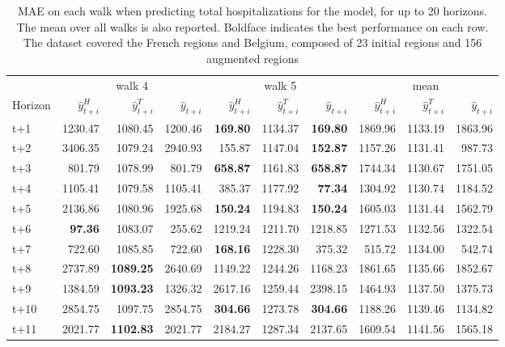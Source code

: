 \begin{table}[H]
\centering
\caption{MAE on each walk when predicting total hospitalizations for the model, for up to 20 horizons. The mean over all walks is also reported. Boldface indicates the best performance on each row. The dataset covered the French regions and Belgium, composed of 23 initial regions and 156 augmented regions }
\label{tab:MAE_walk_assemble}
\begin{tabular}{lrrrrrrrrr}
\toprule
 & \multicolumn{3}{c}{walk 4} & \multicolumn{3}{c}{walk 5} & \multicolumn{3}{c}{mean} 
\\

\cmidrule(lr){2-4} \cmidrule(lr){5-7} \cmidrule(lr){8-10} 
Horizon & $\hat{y}_{t+i}^H$ & $\hat{y}_{t+i}^T$ & $\hat{y}_{t+i}$ & $\hat{y}_{t+i}^H$ & $\hat{y}_{t+i}^T$ & $\hat{y}_{t+i}$ & $\hat{y}_{t+i}^H$ & $\hat{y}_{t+i}^T$ & $\hat{y}_{t+i}$ \\
\midrule
t+1  & 1230.47  & 1080.45  & 1200.46  & \textbf{169.80}  & 1134.37  & \textbf{169.80}  & 1869.96  & 1133.19  & 1863.96  \\
t+2  & 3406.35  & 1079.24  & 2940.93  & 155.87  & 1147.04  & \textbf{152.87}  & 1157.26  & 1131.41  & 987.73  \\
t+3  & 801.79  & 1078.99  & 801.79  & \textbf{658.87}  & 1161.83  & \textbf{658.87}  & 1744.34  & 1130.67  & 1751.05  \\
t+4  & 1105.41  & 1079.58  & 1105.41  & 385.37  & 1177.92  & \textbf{77.34}  & 1304.92  & 1130.74  & 1184.52  \\
t+5  & 2136.86  & 1080.96  & 1925.68  & \textbf{150.24}  & 1194.83  & \textbf{150.24}  & 1605.03  & 1131.44  & 1562.79  \\
t+6  & \textbf{97.36}  & 1083.07  & 255.62  & 1219.24  & 1211.70  & 1218.85  & 1271.53  & 1132.56  & 1322.54  \\
t+7  & 722.60  & 1085.85  & 722.60  & \textbf{168.16}  & 1228.30  & 375.32  & 515.72  & 1134.00  & 542.74  \\
t+8  & 2737.89  & \textbf{1089.25}  & 2640.69  & 1149.22  & 1244.26  & 1168.23  & 1861.65  & 1135.66  & 1852.67  \\
t+9  & 1384.59  & \textbf{1093.23}  & 1326.32  & 2617.16  & 1259.44  & 2398.15  & 1464.93  & 1137.50  & 1375.73  \\
t+10  & 2854.75  & 1097.75  & 2854.75  & \textbf{304.66}  & 1273.78  & \textbf{304.66}  & 1188.26  & 1139.46  & 1134.82  \\
t+11  & 2021.77  & \textbf{1102.83}  & 2021.77  & 2184.27  & 1287.34  & 2137.65  & 1609.54  & 1141.56  & 1565.18  \\

\end{tabular}
\end{table}
